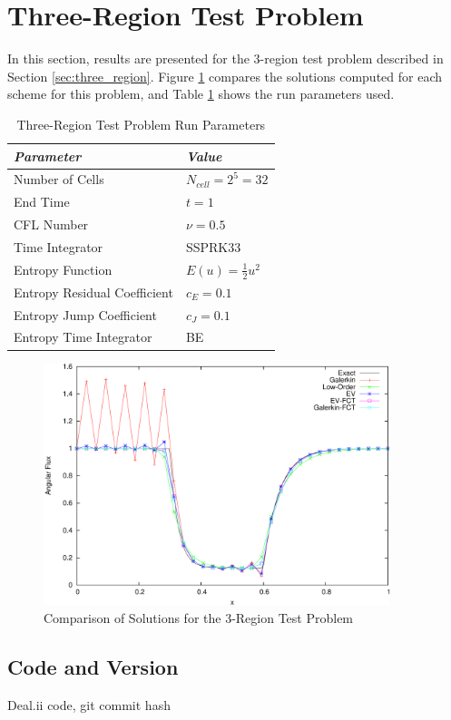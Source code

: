 \section{Three-Region Test Problem}

In this section, results are presented for the 3-region test
problem described in Section \ref{sec:three_region}.
Figure \ref{fig:three_region} compares the solutions computed
for each scheme for this problem, and
Table \ref{tab:three_region_run_parameters} shows the run parameters used.
\begin{table}[h]\caption{Three-Region Test Problem Run Parameters}
\label{tab:three_region_run_parameters}
\centering
\begin{tabular}{l l}\toprule
\emph{Parameter} & \emph{Value}\\\midrule
Number of Cells & $N_{cell} = 2^5 = 32$\\
End Time & $t = 1$\\
CFL Number & $\nu = 0.5$\\
Time Integrator & SSPRK33\\\midrule
Entropy Function & $E(u) = \frac{1}{2}u^2$\\
Entropy Residual Coefficient & $c_E = 0.1$\\
Entropy Jump Coefficient & $c_J = 0.1$\\
Entropy Time Integrator & BE\\
\bottomrule\end{tabular}
\end{table}
\begin{figure}[h]
   \centering
   \includegraphics[width=0.9\textwidth]{three_region/three_region.pdf}
   \caption{Comparison of Solutions for the 3-Region Test Problem}
   \label{fig:three_region}
\end{figure}
\subsection{Code and Version}
Deal.ii code, git commit hash 
